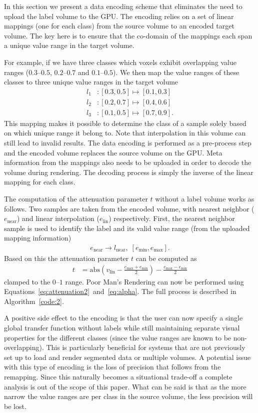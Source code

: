 \documentclass{egpubl}
\begin{document}
In this section we present a data encoding scheme that eliminates the need to upload the label volume to the GPU. The encoding relies on a set of linear mappings (one for each class) from the source volume to an encoded target volume. The key here is to ensure that the co-domain of the mappings each span a unique value range in the target volume. 

For example, if we have three classes which voxels exhibit overlapping value ranges ($0.3$--$0.5$, $0.2$--$0.7$ and $0.1$--$0.5$). We then map the value ranges of these classes to three unique value ranges in the target volume
\begin{align}
l_1&: [0.3,0.5] \mapsto [0.1,0.3] \nonumber\\
l_2&: [0.2,0.7] \mapsto [0.4,0.6] \nonumber\\
l_3&: [0.1,0.5] \mapsto [0.7,0.9] \nonumber  .
\end{align}
This mapping makes it possible to determine the class of a sample solely based on which unique range it belong to. Note that interpolation in this volume can still lead to invalid results. The data encoding is performed as a pre-process step and the encoded volume replaces the source volume on the GPU. Meta information from the mappings also needs to be uploaded in order to decode the volume during rendering. The decoding process is simply the inverse of the linear mapping for each class. 

The computation of the attenuation parameter $t$ without a label volume works as follows. Two samples are taken from the encoded volume, with nearest neighbor ($e_\mathrm{near}$) and linear interpolation ($e_\mathrm{lin}$) respectively. First, the nearest neighbor sample is used to identify the label and its valid value range (from the uploaded mapping information)
\begin{align}
e_\mathrm{near} \rightarrow l_\mathrm{near},\; [e_\mathrm{min}, e_\mathrm{max}]  .
\end{align}
Based on this the attenuation parameter $t$ can be computed as 
\begin{align}
t &= \mathrm{abs}(v_\mathrm{lin} - \frac{e_\mathrm{max} + e_\mathrm{min}}{2}) - \frac{e_\mathrm{max} - e_\mathrm{min}}{2}  \label{eq:attenuation2}
\end{align}
clamped to the $0$--$1$ range. Poor Man's Rendering can now be performed using Equations~\ref{eq:attenuation2}~and~\ref{eq:alpha}. The full process is described in Algorithm~\ref{code:2}.

A positive side effect to the encoding is that the user can now specify a single global transfer function without labels while still maintaining separate visual properties for the different classes (since the value ranges are known to be non-overlapping). This is particularly beneficial for systems that are not previously set up to load and render segmented data or multiple volumes. A potential issue with this type of encoding is the loss of precision that follows from the remapping. Since this naturally becomes a situational trade-off a complete analysis is out of the scope of this paper. What can be said is that as the more narrow the value ranges are per class in the source volume, the less precision will be lost. 
\end{document}
